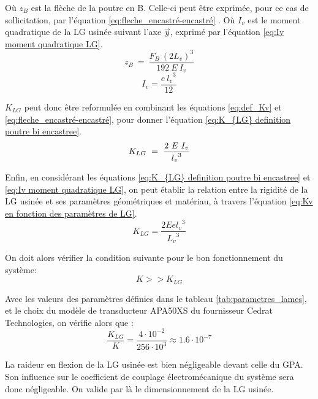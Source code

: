 Où $z_B$ est la flèche de la poutre en B. Celle-ci peut être exprimée, pour ce cas de sollicitation, par l'équation \ref{eq:fleche_encastré-encastré} \cite{Courbon1988}. Où $I_v$ est le moment quadratique de la LG usinée suivant l'axe $\vec{y}$, exprimé par l'équation \ref{eq:Iv moment quadratique LG}.
\begin{equation}
z_B\ =\ \frac{F_B\ {(2L_v)}^3}{192\ E\ I_v}
\label{eq:fleche_encastré-encastré}
\end{equation}
\begin{equation}
	I_v = \dfrac{e\ {l_v}^3}{12}
\label{eq:Iv moment quadratique LG}
\end{equation}

$K_{LG}$ peut donc être reformulée en combinant les équations \ref{eq:def_Kv} et \ref{eq:fleche_encastré-encastré}, pour donner l'équation \ref{eq:K_{LG} definition poutre bi encastree}.
\begin{equation}
K_{LG}\ =\ \frac{2\ E\ I_v}{{l_v}^3}
\label{eq:K_{LG} definition poutre bi encastree}
\end{equation}

Enfin, en considérant les équations \ref{eq:K_{LG} definition poutre bi encastree} et \ref{eq:Iv moment quadratique LG}, on peut établir la relation entre la rigidité de la LG usinée et ses paramètres géométriques et matériau, à travers l'équation \ref{eq:Kv en fonction des paramètres de LG}.
\begin{equation}
	K_{LG} = \dfrac{2Ee{l_v}^3}{{L_v}^3}
\label{eq:Kv en fonction des paramètres de LG}
\end{equation}

On doit alors vérifier la condition suivante pour le bon fonctionnement du système:
\begin{equation}
K >> K_{LG}
\label{eq:rapport_K/Kv}
\end{equation}

Avec les valeurs des paramètres définies dans le tableau \ref{tab:parametres_lames}, et le choix du modèle de transducteur APA50XS du fournisseur Cedrat Technologies, on vérifie alors que :
\begin{equation}
\frac{K_{LG}}{K} = \frac{4\cdot 10^{-2}}{256\cdot 10^3}\approx 1.6\cdot 10^{-7}
\end{equation}

La raideur en flexion de la LG usinée est bien négligeable devant celle du GPA. Son influence sur le coefficient de couplage électromécanique du système sera donc négligeable. On valide par là le dimensionnement de la LG usinée.
